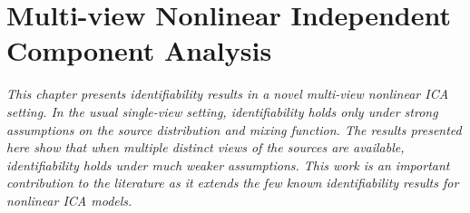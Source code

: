 
\newcommand\independent{\protect\mathpalette{\protect\independenT}{\perp}}
\def\independenT#1#2{\mathrel{\rlap{$#1#2$}\mkern2mu{#1#2}}}


\chapter{Multi-view Nonlinear Independent Component Analysis}\label{chapter:ica}

\ifpdf
    \graphicspath{{Chapter4/Figs/Raster/}{Chapter4/Figs/PDF/}{Chapter4/Figs/}}
\else
    \graphicspath{{Chapter4/Figs/Vector/}{Chapter4/Figs/}}
\fi

\emph{%
This chapter presents identifiability results in a novel multi-view nonlinear ICA setting.
In the usual single-view setting, identifiability holds only under strong assumptions on the source distribution and mixing function.
The results presented here show that when multiple distinct views of the sources are available, identifiability holds under much weaker assumptions.
This work is an important contribution to the literature as it extends the few known identifiability results for nonlinear ICA models.}

%
%



